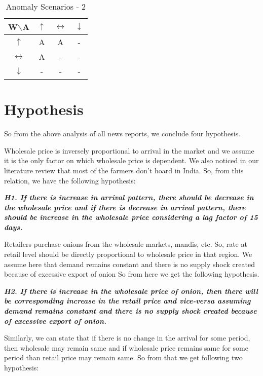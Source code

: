\begin{table}
\centering
\begin{tabular}{ | c | c | c | c |}  
  \hline
  \textbf{W$\backslash$A} & \textbf{$\uparrow$} & \textbf{$\leftrightarrow$}  & \textbf{$\downarrow$} \\ \hline
  \textbf{$\uparrow$} & {\color{red}A} & {\color{red}A} & - \\ \hline
  \textbf{$\leftrightarrow$} & {\color{red}A} & - & - \\ \hline
  \textbf{$\downarrow$} & - & - & - \\ \hline
\end{tabular}
\caption{Anomaly Scenarios - 2}
\label{table:2}
\end{table}

\section{Hypothesis}

So from the above analysis of all news reports, we conclude four hypothesis.

Wholesale price is inversely proportional to arrival in the market and we assume it is the only factor on which wholesale price is dependent. We also noticed in our literature review that most of the farmers don't hoard in India. So, from this relation, we have the following hypothesis:

\textbf{\textit{H1. If there is increase in arrival pattern, there should be decrease in the wholesale price and if there is decrease in arrival pattern, there should be increase in the wholesale price considering a lag factor of 15 days.}}

Retailers purchase onions from the wholesale markets, mandis, etc. So, rate at retail level should be directly proportional to wholesale price in that region. We assume here that demand remains constant and there is no supply shock created because of excessive export of onion So from here we get the following hypothesis.

\textbf{\textit{H2. If there is increase in the wholesale price of onion, then there will be corresponding increase in the retail price and vice-versa assuming demand remains constant and there is no supply shock created because of excessive export of onion.}}

Similarly, we can state that if there is no change in the arrival for some period, then wholesale may remain same and if wholesale price remains same for some period than retail price may remain same. So from that we get following two hypothesis:


